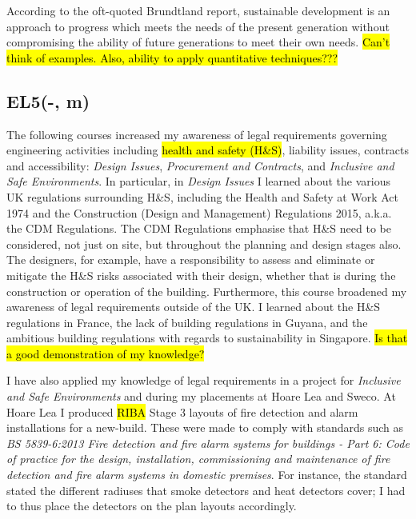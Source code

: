 According to the oft-quoted Brundtland report, sustainable development is an approach to progress which meets the needs of the present generation without compromising the ability of future generations to meet their own needs.
\hl{Can't think of examples. Also, ability to apply quantitative techniques???}



\subsection*{EL5(-, m)}

The following courses increased my awareness of legal requirements governing engineering activities including \hl{health and safety (H\&S)}, liability issues, contracts and accessibility:
\textit{Design Issues},
\textit{Procurement and Contracts},
and \textit{Inclusive and Safe Environments}.
In particular, in \textit{Design Issues} I learned about the various UK regulations surrounding H\&S, including the Health and Safety at Work Act 1974 and the Construction (Design and Management) Regulations 2015, a.k.a. the CDM Regulations.
The CDM Regulations emphasise that H\&S need to be considered, not just on site, but throughout the planning and design stages also.
The designers, for example, have a responsibility to assess and eliminate or mitigate the H\&S risks associated with their design, whether that is during the construction or operation of the building.
Furthermore, this course broadened my awareness of legal requirements outside of the UK.
I learned about the H\&S regulations in France, the lack of building regulations in Guyana, and the ambitious building regulations with regards to sustainability in Singapore.
\hl{Is that a good demonstration of my knowledge?}

I have also applied my knowledge of legal requirements in a project for \textit{Inclusive and Safe Environments} and during my placements at Hoare Lea and Sweco.
At Hoare Lea I produced \hl{RIBA} Stage 3 layouts of fire detection and alarm installations for a new-build.
These were made to comply with standards such as \textit{BS 5839-6:2013 Fire detection and fire alarm systems for buildings - Part 6: Code of practice for the design, installation, commissioning and maintenance of fire detection and fire alarm systems in domestic premises}.
For instance, the standard stated the different radiuses that smoke detectors and heat detectors cover; I had to thus place the detectors on the plan layouts accordingly.


